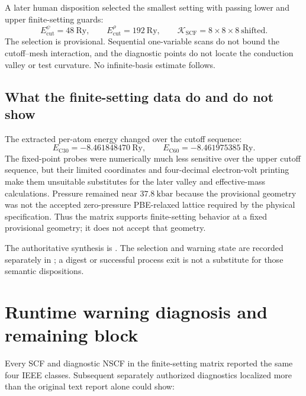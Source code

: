 A later human disposition selected the smallest setting with passing lower and
upper finite-setting guards:
\begin{equation}
  E_{\mathrm{cut}}^{\psi}=48\ \mathrm{Ry},\qquad
  E_{\mathrm{cut}}^{\rho}=192\ \mathrm{Ry},\qquad
  \mathcal K_{\mathrm{SCF}}=8\times8\times8\ \text{shifted}.
\end{equation}
The selection is provisional. Sequential one-variable scans do not bound the
cutoff--mesh interaction, and the diagnostic points do not locate the
conduction valley or test curvature. No infinite-basis estimate follows.

\subsection{What the finite-setting data do and do not show}

The extracted per-atom energy changed over the cutoff sequence:
\begin{equation}
  E_{\mathrm{C30}}=-8.461848470\ \mathrm{Ry},\qquad
  E_{\mathrm{C60}}=-8.461975385\ \mathrm{Ry}.
\end{equation}
The fixed-point probes were numerically much less sensitive over the upper
cutoff sequence, but their
limited coordinates and four-decimal electron-volt printing make them
unsuitable substitutes for the later valley and effective-mass calculations.
Pressure remained near $37.8\ \mathrm{kbar}$ because the provisional geometry
was not the accepted zero-pressure PBE-relaxed lattice required by the physical
specification. Thus the matrix supports finite-setting behavior at a fixed
provisional geometry; it does not accept that geometry.

The authoritative synthesis is
.
The selection and warning state are recorded separately in
; a digest or successful process
exit is not a substitute for those semantic dispositions.

\section{Runtime warning diagnosis and remaining block}

Every SCF and diagnostic NSCF in the finite-setting matrix reported the same
four IEEE classes. Subsequent separately authorized diagnostics localized more
than the original text report alone could show:

